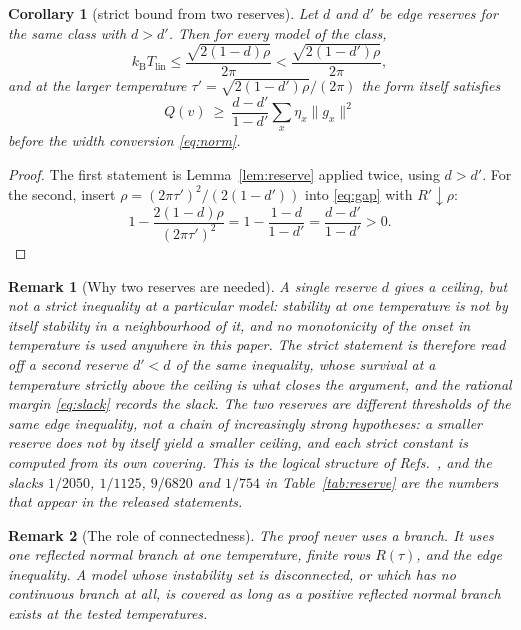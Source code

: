 \documentclass[aps,10pt,superscriptaddress,floatfix,amsmath,amssymb,nofootinbib]{revtex4-2}
\newcommand{\kb}{k_{\mathrm B}}
\newcommand{\Tlin}{T_{\mathrm{lin}}}
\newtheorem{corollary}{Corollary}
\newtheorem{remark}{Remark}
\begin{document}
\begin{corollary}[strict bound from two reserves]\label{cor:strict}
Let $d$ and $d'$ be edge reserves for the same class with $d>d'$. Then for every model of
the class,
\begin{equation}\label{eq:strict}
\kb\Tlin\le\frac{\sqrt{2(1-d)\rho}}{2\pi}<\frac{\sqrt{2(1-d')\rho}}{2\pi},
\end{equation}
and at the larger temperature $\tau'=\sqrt{2(1-d')\rho}/(2\pi)$ the form itself satisfies
\begin{equation}\label{eq:slack}
Q(v)\ \ge\ \frac{d-d'}{1-d'}\sum_x\eta_x\|g_x\|^{2}
\end{equation}
before the width conversion \eqref{eq:norm}.
\end{corollary}

\begin{proof}
The first statement is Lemma~\ref{lem:reserve} applied twice, using $d>d'$. For the second,
insert $\rho=(2\pi\tau')^{2}/(2(1-d'))$ into \eqref{eq:gap} with $R'\downarrow\rho$:
\[
1-\frac{2(1-d)\rho}{(2\pi\tau')^{2}}
=1-\frac{1-d}{1-d'}=\frac{d-d'}{1-d'}>0 .
\]
\end{proof}

\begin{remark}[Why two reserves are needed]\label{rem:tworeason}
A single reserve $d$ gives a ceiling, but not a strict inequality at a particular model:
stability at one temperature is not by itself stability in a neighbourhood of it, and no
monotonicity of the onset in temperature is used anywhere in this paper. The strict
statement is therefore read off a second reserve $d'<d$ of the same inequality, whose
survival at a temperature strictly above the ceiling is what closes the argument, and the
rational margin \eqref{eq:slack} records the slack. The two reserves are different
thresholds of the same edge inequality, not a chain of increasingly strong hypotheses: a
smaller reserve does not by itself yield a smaller ceiling, and each strict constant is
computed from its own covering. This is the logical structure of
Refs.~\cite{finiteenergy,anisosharp}, and the slacks $1/2050$, $1/1125$, $9/6820$ and
$1/754$ in Table~\ref{tab:reserve} are the numbers that appear in the released statements.
\end{remark}

\begin{remark}[The role of connectedness]\label{rem:connect}
The proof never uses a branch. It uses one reflected normal branch at one temperature,
finite rows $R(\tau)$, and the edge inequality. A model whose instability set is
disconnected, or which has no continuous branch at all, is covered as long as a positive
reflected normal branch exists at the tested temperatures.
\end{remark}
\end{document}
